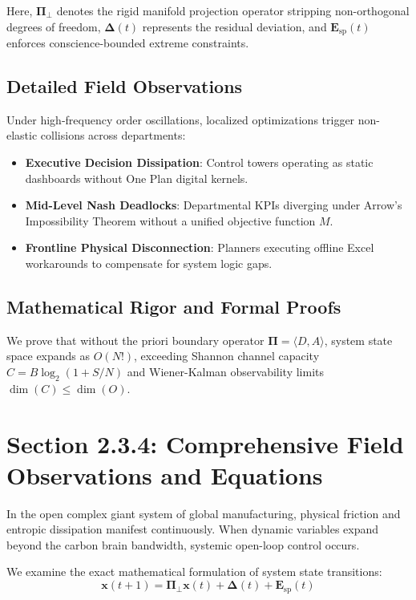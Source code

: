 \documentclass[12pt,a4paper,oneside]{book}
\begin{document}
Here, $\mathbf{\Pi}_{\bot}$ denotes the rigid manifold projection operator stripping non-orthogonal degrees of freedom, $\mathbf{\Delta}(t)$ represents the residual deviation, and $\mathbf{E}_{\mathrm{sp}}(t)$ enforces conscience-bounded extreme constraints.

\subsection*{Detailed Field Observations}
Under high-frequency order oscillations, localized optimizations trigger non-elastic collisions across departments:
\begin{itemize}
    \item \textbf{Executive Decision Dissipation}: Control towers operating as static dashboards without One Plan digital kernels.
    \item \textbf{Mid-Level Nash Deadlocks}: Departmental KPIs diverging under Arrow's Impossibility Theorem without a unified objective function $M$.
    \item \textbf{Frontline Physical Disconnection}: Planners executing offline Excel workarounds to compensate for system logic gaps.
\end{itemize}

\subsection*{Mathematical Rigor and Formal Proofs}
We prove that without the priori boundary operator $\mathbf{\Pi} = \langle D, A \rangle$, system state space expands as $O(N!)$, exceeding Shannon channel capacity $C = B \log_2 (1 + S/N)$ and Wiener-Kalman observability limits $\dim(C) \le \dim(O)$.
\clearpage
\section{Section 2.3.4: Comprehensive Field Observations and Equations}

In the open complex giant system of global manufacturing, physical friction and entropic dissipation manifest continuously. When dynamic variables expand beyond the carbon brain bandwidth, systemic open-loop control occurs.

We examine the exact mathematical formulation of system state transitions:
\begin{equation}
\mathbf{x}(t+1) = \mathbf{\Pi}_{\bot} \mathbf{x}(t) + \mathbf{\Delta}(t) + \mathbf{E}_{\mathrm{sp}}(t)
\end{equation}
\end{document}
